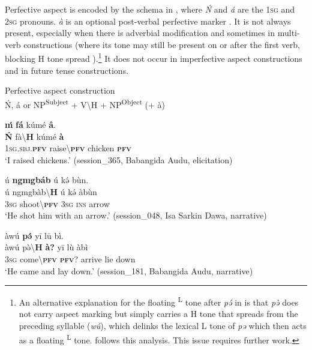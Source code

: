 \documentclass[output=paper,colorlinks,citecolor=brown]{langscibook}
\begin{document}
Perfective aspect is encoded by the schema in , where \textit{\'{N}} and \textit{á} are the 1\textsc{sg} and 2\textsc{sg} pronouns. \textit{à} is an optional post-verbal perfective marker . It is not always present, especially when there is adverbial modification  and sometimes in multi-verb constructions (where its tone may still be present on or after the first verb, blocking H tone spread ).\footnote{An alternative explanation for the floating \textsuperscript{L} tone after \textit{pə́} in  is that \textit{pə̀} does not carry aspect marking but simply carries a H tone that spreads from the preceding syllable (\textit{wú}), which delinks the lexical L tone of \textit{pə} which then acts as a floating \textsuperscript{L} tone. \citet[309]{Lesage2020} follows this analysis. This issue requires further work.} It does not occur in imperfective aspect constructions and in future tense constructions.

\ea\label{ex:kam:15} 
    Perfective aspect construction\\
    \'{N}, á or NP\textsuperscript{Subject} + V{\textbackslash}H + NP\textsuperscript{Object} (+ à)
\z 

\ea\label{ex:kam:16} 
    \glll \textbf{ḿ} \textbf{fá} kúmé \textbf{â}.\\
        \textbf{\'{N}} fà{\textbackslash}\textbf{H} kúmé \textbf{à}\\
        \textsc{1sg}.\textsc{sbj}.\textbf{\textsc{pfv}} raise{\textbackslash}\textbf{\textsc{pfv}} chicken \textbf{\textsc{pfv}}\\
    \glt ‘I raised chickens.’ (session\_365, Babangida Audu, elicitation)
\z 

\ea\label{ex:kam:17} 
    \glll ú \textbf{ngmgbáb} ú kə́ bùn. \\
        ú ngmgbàb{\textbackslash}\textbf{H} ú kə́ àbùn\\
        \textsc{3sg} shoot{\textbackslash}\textbf{\textsc{pfv}} \textsc{3sg} \textsc{ins} arrow\\
    \glt ‘He shot him with an arrow.’ (session\_048, Isa Sarkin Dawa, narrative)
\z 

\ea\label{ex:kam:18} 
    \glll àwú \textbf{pə́} yī lū bì.\\
        àwú pə̀{\textbackslash}\textbf{H} \textbf{à?} yī lù àbì\\
        \textsc{3sg} come{\textbackslash}\textbf{\textsc{pfv}} \textbf{\textsc{pfv}}? arrive lie down\\
    \glt ‘He came and lay down.’ (session\_181, Babangida Audu, narrative)
\z 
\end{document}
